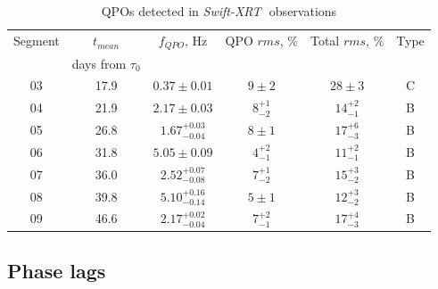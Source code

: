 \documentclass[a4paper,fleqn,usenatbib]{mnras}
\def\swiftx{{\em Swift-XRT\,}}
\begin{document}
\begin{table}
\noindent
\centering
\caption{QPOs detected in \swiftx\, observations}
\label{tab:xrtqpo}
\centering
\begin{tabular}{|c|c|c|c|c|c|}
\hline\hline
Segment &$t_{mean}$                   & $f_{QPO}$, Hz & QPO $rms$, \% & Total $rms$, \% & Type\\
                &   days from $\tau_{0}$     &                           &                           &                            &\\
\hline
03  &17.9&  $0.37\pm0.01$            & $9\pm2$       & $28\pm3$        & C\\
04  &21.9&  $2.17\pm0.03$            & $8_{-2}^{+1}$ & $14_{-1}^{+2}$  & B\\
05  &26.8&  $1.67_{-0.04}^{+0.03}$   & $8\pm1$       & $17_{-3}^{+6}$  & B\\ 
06  &31.8&  $5.05\pm0.09$            & $4_{-1}^{+2}$ & $11_{-1}^{+2}$  & B\\
07  &36.0&  $2.52_{-0.08}^{+0.07}$   & $7_{-2}^{+1}$ & $15_{-2}^{+3}$  & B\\ 
08  &39.8&  $5.10_{-0.14}^{+0.16}$   & $5\pm1$       & $12_{-2}^{+3}$  & B\\
09  &46.6&  $2.17_{-0.04}^{+0.02}$   & $7_{-1}^{+2}$ & $17_{-3}^{+4}$  & B\\
\hline
\end{tabular}
\end{table}

\subsection{Phase lags}
\end{document}
